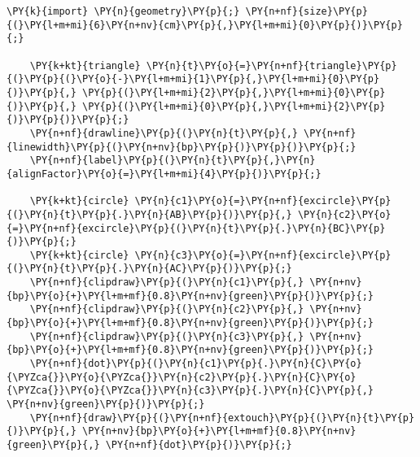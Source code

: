 \begin{Verbatim}[commandchars=\\\{\}]
    \PY{k}{import} \PY{n}{geometry}\PY{p}{;} \PY{n+nf}{size}\PY{p}{(}\PY{l+m+mi}{6}\PY{n+nv}{cm}\PY{p}{,}\PY{l+m+mi}{0}\PY{p}{)}\PY{p}{;}

    \PY{k+kt}{triangle} \PY{n}{t}\PY{o}{=}\PY{n+nf}{triangle}\PY{p}{(}\PY{p}{(}\PY{o}{-}\PY{l+m+mi}{1}\PY{p}{,}\PY{l+m+mi}{0}\PY{p}{)}\PY{p}{,} \PY{p}{(}\PY{l+m+mi}{2}\PY{p}{,}\PY{l+m+mi}{0}\PY{p}{)}\PY{p}{,} \PY{p}{(}\PY{l+m+mi}{0}\PY{p}{,}\PY{l+m+mi}{2}\PY{p}{)}\PY{p}{)}\PY{p}{;}
    \PY{n+nf}{drawline}\PY{p}{(}\PY{n}{t}\PY{p}{,} \PY{n+nf}{linewidth}\PY{p}{(}\PY{n+nv}{bp}\PY{p}{)}\PY{p}{)}\PY{p}{;}
    \PY{n+nf}{label}\PY{p}{(}\PY{n}{t}\PY{p}{,}\PY{n}{alignFactor}\PY{o}{=}\PY{l+m+mi}{4}\PY{p}{)}\PY{p}{;}

    \PY{k+kt}{circle} \PY{n}{c1}\PY{o}{=}\PY{n+nf}{excircle}\PY{p}{(}\PY{n}{t}\PY{p}{.}\PY{n}{AB}\PY{p}{)}\PY{p}{,} \PY{n}{c2}\PY{o}{=}\PY{n+nf}{excircle}\PY{p}{(}\PY{n}{t}\PY{p}{.}\PY{n}{BC}\PY{p}{)}\PY{p}{;}
    \PY{k+kt}{circle} \PY{n}{c3}\PY{o}{=}\PY{n+nf}{excircle}\PY{p}{(}\PY{n}{t}\PY{p}{.}\PY{n}{AC}\PY{p}{)}\PY{p}{;}
    \PY{n+nf}{clipdraw}\PY{p}{(}\PY{n}{c1}\PY{p}{,} \PY{n+nv}{bp}\PY{o}{+}\PY{l+m+mf}{0.8}\PY{n+nv}{green}\PY{p}{)}\PY{p}{;}
    \PY{n+nf}{clipdraw}\PY{p}{(}\PY{n}{c2}\PY{p}{,} \PY{n+nv}{bp}\PY{o}{+}\PY{l+m+mf}{0.8}\PY{n+nv}{green}\PY{p}{)}\PY{p}{;}
    \PY{n+nf}{clipdraw}\PY{p}{(}\PY{n}{c3}\PY{p}{,} \PY{n+nv}{bp}\PY{o}{+}\PY{l+m+mf}{0.8}\PY{n+nv}{green}\PY{p}{)}\PY{p}{;}
    \PY{n+nf}{dot}\PY{p}{(}\PY{n}{c1}\PY{p}{.}\PY{n}{C}\PY{o}{\PYZca{}}\PY{o}{\PYZca{}}\PY{n}{c2}\PY{p}{.}\PY{n}{C}\PY{o}{\PYZca{}}\PY{o}{\PYZca{}}\PY{n}{c3}\PY{p}{.}\PY{n}{C}\PY{p}{,} \PY{n+nv}{green}\PY{p}{)}\PY{p}{;}
    \PY{n+nf}{draw}\PY{p}{(}\PY{n+nf}{extouch}\PY{p}{(}\PY{n}{t}\PY{p}{)}\PY{p}{,} \PY{n+nv}{bp}\PY{o}{+}\PY{l+m+mf}{0.8}\PY{n+nv}{green}\PY{p}{,} \PY{n+nf}{dot}\PY{p}{)}\PY{p}{;}
\end{Verbatim}
